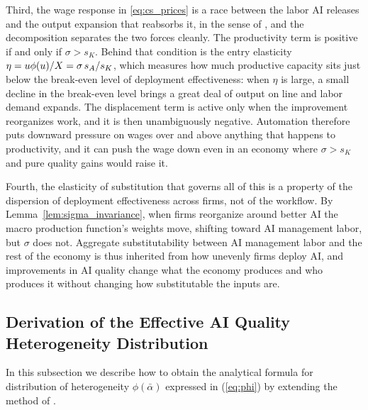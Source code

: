 Third, the wage response in \eqref{eq:cs_prices} is a race between the labor AI releases and the output expansion that reabsorbs it, in the sense of \cite{acemoglu2019automation}, and the decomposition separates the two forces cleanly.
The productivity term is positive if and only if $\sigma > s_{K}$.
Behind that condition is the entry elasticity $\eta = u\phi(u)/X = \sigma\,s_{A}/s_{K}$, which measures how much productive capacity sits just below the break-even level of deployment effectiveness: when $\eta$ is large, a small decline in the break-even level brings a great deal of output on line and labor demand expands.
The displacement term is active only when the improvement reorganizes work, and it is then unambiguously negative.
Automation therefore puts downward pressure on wages over and above anything that happens to productivity, and it can push the wage down even in an economy where $\sigma > s_{K}$ and pure quality gains would raise it.

Fourth, the elasticity of substitution that governs all of this is a property of the dispersion of deployment effectiveness across firms, not of the workflow.
By Lemma~\ref{lem:sigma_invariance}, when firms reorganize around better AI the macro production function's weights move, shifting toward AI management labor, but $\sigma$ does not.
Aggregate substitutability between AI management labor and the rest of the economy is thus inherited from how unevenly firms deploy AI, and improvements in AI quality change what the economy produces and who produces it without changing how substitutable the inputs are.



\subsection{Derivation of the Effective AI Quality Heterogeneity Distribution}
\label{sec:aggregationDist}

In this subsection we describe how to obtain the analytical formula for distribution of heterogeneity $\phi(\bar{\alpha})$ expressed in (\ref{eq:phi}) by extending the method of \cite{levhari1968note}.

